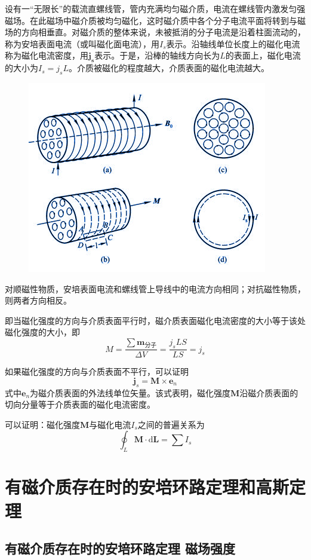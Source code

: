 \documentclass[12pt]{article}
\newcommand{\rmd}{\mathrm{d}}
\begin{document}
设有一“无限长”的载流直螺线管，管内充满均匀磁介质，电流在螺线管内激发匀强磁场。在此磁场中磁介质被均匀磁化，这时磁介质中各个分子电流平面将转到与磁场的方向相垂直。对磁介质的整体来说，未被抵消的分子电流是沿着柱面流动的，称为安培表面电流（或叫磁化面电流），用\(I_s\)表示。沿轴线单位长度上的磁化电流称为磁化电流密度，用\(\boldsymbol{j_s}\)表示。于是，沿棒的轴线方向长为\(L\)的表面上，磁化电流的大小为\(I_s = j_s L\)。介质被磁化的程度越大，介质表面的磁化电流越大。

\begin{figure}[!h]
    \centering
    \includegraphics[width = .4\textwidth]{graphics/磁化电流.png}
\end{figure}

对顺磁性物质，安培表面电流和螺线管上导线中的电流方向相同；对抗磁性物质，则两者方向相反。

即当磁化强度的方向与介质表面平行时，磁介质表面磁化电流密度的大小等于该处磁化强度的大小，即
\begin{equation}
    M = \frac{\sum  \boldsymbol{m}_{\text{分子}}}{\Delta V} = \frac{j_s L S}{L S} = j_s
\end{equation}

如果磁化强度的方向与介质表面不平行，可以证明
\begin{equation}
    \boldsymbol{j}_s = \boldsymbol{M} \times \boldsymbol{e}_n
\end{equation}
式中\(\boldsymbol{e}_n\)为磁介质表面的外法线单位矢量。该式表明，磁化强度\(\boldsymbol{M}\)沿磁介质表面的切向分量等于介质表面的磁化电流密度。

可以证明：磁化强度\(\boldsymbol{M}\)与磁化电流\(I_s\)之间的普遍关系为
\begin{equation}
    \oint_L \boldsymbol{M} \cdot \rmd \boldsymbol{L} = \sum I_s
    \label{13-6}
\end{equation}

\section{有磁介质存在时的安培环路定理和高斯定理}

\subsection{有磁介质存在时的安培环路定理 \quad 磁场强度}
\end{document}
